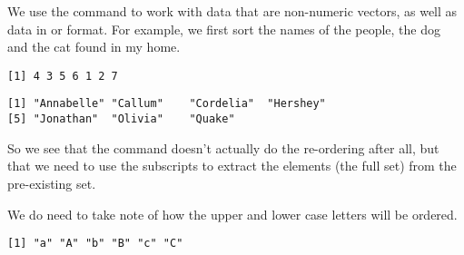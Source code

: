  
We use the  command to work with data that are non-numeric vectors, as well as data in  or  format. For example, we first sort the names of the people, the dog and the cat found in my home. 
\begin{knitrout}
\color{fgcolor}\begin{kframe}
\begin{alltt}
\hlstd{> }\hlkwb{=}\hlstd{(}\hlstd{,} \hlstd{,} \hlstd{,} \hlstd{,} \hlstd{,} \hlstd{,} \hlstd{)}
\hlstd{> }
\end{alltt}
\begin{verbatim}
[1] 4 3 5 6 1 2 7
\end{verbatim}
\begin{alltt}
\hlstd{> }\hlstd{Home[}\hlstd{(Home)]}
\end{alltt}
\begin{verbatim}
[1] "Annabelle" "Callum"    "Cordelia"  "Hershey"  
[5] "Jonathan"  "Olivia"    "Quake"    
\end{verbatim}
\end{kframe}
\end{knitrout}
 
So we see that the  command doesn't actually do the re-ordering after all, but that we need to use the subscripts to extract the elements (the full set) from the pre-existing set. 
 
We do need to take note of how the upper and lower case letters will be ordered. 
\begin{knitrout}
\color{fgcolor}\begin{kframe}
\begin{alltt}
\hlstd{> }\hlkwb{=}\hlstd{(}\hlstd{,} \hlstd{,} \hlstd{,} \hlstd{,} \hlstd{,} \hlstd{)}
\hlstd{> }\hlstd{SomeLetters[}\hlstd{(SomeLetters)]}
\end{alltt}
\begin{verbatim}
[1] "a" "A" "b" "B" "c" "C"
\end{verbatim}
\end{kframe}
\end{knitrout}
 
